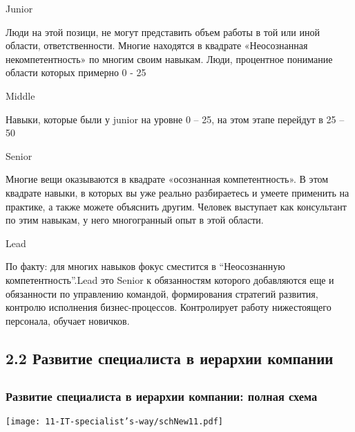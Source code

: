 \documentclass{../industrial-development}
\begin{document}
\lecturenotes

Junior~\cite{JMSL}

Люди на этой позици, не могут представить объем работы в той или иной области, ответственности. Многие находятся в квадрате «Неосознанная некомпетентность» по многим своим навыкам. Люди, процентное понимание области которых примерно 0 - 25%

Middle 

Навыки, которые были у junior на уровне 0 – 25, на этом этапе перейдут в 25 – 50%

Senior

Многие вещи оказываются в квадрате «осознанная компетентность». В этом квадрате навыки, в которых вы уже реально разбираетесь и умеете применить на практике, а также можете объяснить другим. Человек выступает как консультант по этим навыкам, у него многогранный опыт в этой области.

Lead

По факту: для многих навыков фокус сместится в “Неосознанную компетентность”.Lead это Senior к обязанностям которого добавляются еще и обязанности по управлению командой, формирования стратегий развития, контролю исполнения бизнес-процессов. Контролирует работу нижестоящего персонала, обучает новичков.



\subsection{2.2 Развитие  специалиста в иерархии компании  }

\subsection{}

\begin{frame} \frametitle{Развитие  специалиста в иерархии компании: полная схема }
  \centerline{\texttt{[image: 11-IT-specialist's-way/schNew11.pdf]}}
\end{frame}

\lecturenotes
\end{document}
